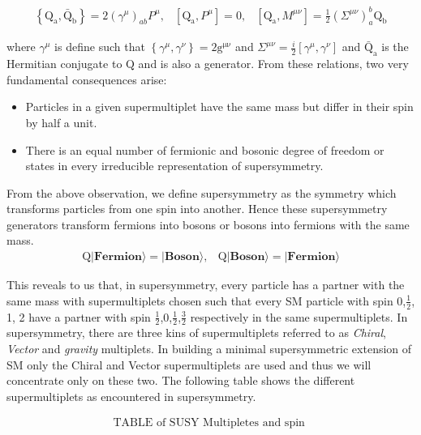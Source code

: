 \begin{eqnarray}
\left\lbrace\mathrm{Q_{a}}, \mathrm{\bar{Q}_{b}}\right\rbrace =  2\left(\gamma^{\mu}\right)_{ab}P^{\mu}, &
\left[\mathrm{Q_{a}},P^{\mu}\right] = 0, &
\left[\mathrm{Q_{a}}, M^{\mu\nu}\right] =\frac{1}{2}\left(\Sigma^{\mu\nu}\right)_{a}^{b}\mathrm{Q_{b}}
\end{eqnarray}

where $\gamma^{\mu}$ is define such that $\left\lbrace \gamma^{\mu}, \gamma^{\nu}\right\rbrace = 2\mathrm{g^{\mu\nu}}$ and  $\Sigma^{\mu\nu} = \frac{i}{2}\left[\gamma^{\mu},\gamma^{\nu}\right]$ and $\mathrm{\bar{Q}_{a}}$ 
is the Hermitian conjugate to $\mathrm{Q}$ and is also a generator.
From these relations, two very fundamental consequences arise:
\begin{itemize}
\item  Particles in a given supermultiplet have the same mass but differ in their spin by half a unit.
\item There is an equal number of fermionic and bosonic degree of freedom or states in every irreducible representation of supersymmetry. 
\end{itemize}
From the above observation, we define supersymmetry as the symmetry which transforms particles from one spin into another.  Hence these supersymmetry generators transform fermions into bosons or bosons into fermions with the same mass.\begin{eqnarray}
\mathrm{Q}|\textbf{Fermion}\rangle =|\textbf{Boson}\rangle,    &
\mathrm{Q}|\textbf{Boson}\rangle  =|\textbf{Fermion} \rangle 
\end{eqnarray}

This reveals to us that, in supersymmetry, every particle has a partner with the same mass with supermultiplets chosen such that every SM particle with spin 0,$\frac{1}{2}$, 1, 2 have a partner with spin $\frac{1}{2}$,0,$\frac{1}{2}$,$\frac{3}{2}$ respectively in the same supermultiplets.
In supersymmetry, there are three kins of supermultiplets referred to as \textit{Chiral}, \textit{Vector} and \textit{gravity} multiplets. In building a minimal supersymmetric extension of SM only the Chiral and Vector supermultiplets are used and thus we will concentrate only on these two. 
The following table shows the different supermultiplets as encountered in supersymmetry.

\begin{align}
 \mbox{TABLE of SUSY Multipletes and spin }
\end{align}

